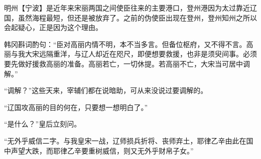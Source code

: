 明州【宁波】是近年来宋丽两国之间使臣往来的主要港口，登州港因为太过靠近辽国，虽然海程最短，但还是被放弃了。之前的伪使臣出现在登州，登州知州之所以会起疑心，正是因为这个理由。

韩冈斟词酌句：“臣对高丽内情不明，本不当多言。但备位枢府，又不得不言。高丽与我大宋远隔重洋，与辽人却近在咫尺，即便想要救援，也非是须臾间事。必须要先做好援救高丽的准备。高丽若亡，一切休提。若高丽不亡，大宋当可居中调解。”

“调解？”这些天来，宰辅们都在说暗助，可从来没说过要调解的。

“辽国攻高丽的目的何在，只要想一想明白了。”

“是什么？”皇后立刻问。

“无外乎威信二字。与我皇宋一战，辽师损兵折将、丧师弃土，耶律乙辛由此在国中声望大跌，而耶律乙辛要重树威信，则又无外乎财帛子女。”

